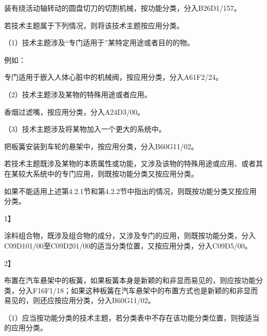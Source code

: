 装有绕活动轴转动的圆盘切刀的切割机械，按功能分类，分入B26D1/157。

若技术主题属于下列情况，则将该技术主题按应用分类。

{\setlength{\parindent}{17.1bp}（1）技术主题涉及“专门适用于”某特定用途或者目的的物。\par}

例如：

专门适用于嵌入人体心脏中的机械阀，按应用分类，分入A61F2/24。

{\setlength{\parindent}{17.1bp}（2）技术主题涉及某物的特殊用途或者应用。\par}

{\par}

香烟过滤嘴，按应用分类，分入A24D3/00。

{\setlength{\parindent}{17.1bp}（3）技术主题涉及将某物加入一个更大的系统中。\par}

{\par}

把板簧安装到车轮的悬架中，按应用分类，分入B60G11/02。

若技术主题既涉及某物的本质属性或功能，又涉及该物的特殊用途或应用、或者其在某较大系统中的专门应用，则既按功能分类又按应用分类。

如果不能适用上述第4.2.1节和第4.2.2节中指出的情况，则既按功能分类又按应用分类。

{1】\par}

涂料组合物，既涉及组合物的成分，又涉及专门的应用，则既按功能分类，分入C09D101/00至C09D201/00的适当分类位置，又按应用分类，分入C09D5/00。

{2】\par}

布置在汽车悬架中的板簧，如果板簧本身是新颖的和非显而易见的，则应按功能分类，分入F16F1/18；如果这种板簧在汽车悬架中的布置方式也是新颖的和非显而易见的，则还应按应用分类，分入B60G11/02。

{\setlength{\parindent}{17.1bp}（1）应当按功能分类的技术主题，若分类表中不存在该功能分类位置，则按适当的应用分类。\par}

